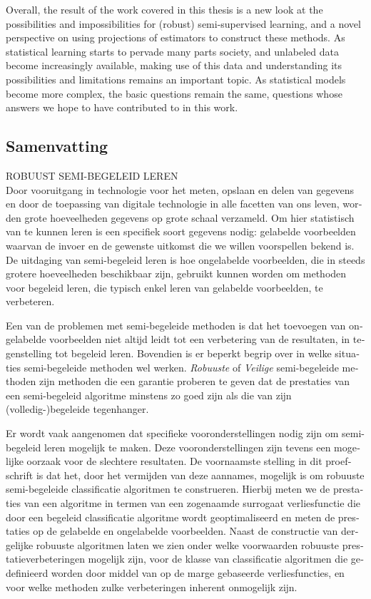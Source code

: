 Overall, the result of the work covered in this thesis is a new look at the possibilities and impossibilities for (robust) semi-supervised learning, and a novel perspective on using projections of estimators to construct these methods. As statistical learning starts to pervade many parts society, and unlabeled data become increasingly available, making use of this data and understanding its possibilities and limitations remains an important topic. As statistical models become more complex, the basic questions remain the same, questions whose answers we hope to have contributed to in this work.

\begin{otherlanguage}{dutch}
\chapter{Samenvatting}
{\LARGE{\textsf{\MakeUppercase{Robuust Semi-begeleid Leren}}}}
\\[12pt]
Door vooruitgang in technologie voor het meten, opslaan en delen van gegevens en door de toepassing van digitale technologie in alle facetten van ons leven, worden grote hoeveelheden gegevens op grote schaal verzameld. Om hier statistisch van te kunnen leren is een specifiek soort gegevens nodig: gelabelde voorbeelden waarvan de invoer en de gewenste uitkomst die we willen voorspellen bekend is. De uitdaging van semi-begeleid leren is hoe ongelabelde voorbeelden, die in steeds grotere hoeveelheden beschikbaar zijn, gebruikt kunnen worden om methoden voor begeleid leren, die typisch enkel leren van gelabelde voorbeelden, te verbeteren.

Een van de problemen met semi-begeleide methoden is dat het toevoegen van ongelabelde voorbeelden niet altijd leidt tot een verbetering van de resultaten, in tegenstelling tot begeleid leren. Bovendien is er beperkt begrip over in welke situaties semi-begeleide methoden wel werken. \emph{Robuuste} of \emph{Veilige} semi-begeleide methoden zijn methoden die een garantie proberen te geven dat de prestaties van een semi-begeleid algoritme minstens zo goed zijn als die van zijn (volledig-)begeleide tegenhanger.

Er wordt vaak aangenomen dat specifieke vooronderstellingen nodig zijn om semi-begeleid leren mogelijk te maken. Deze vooronderstellingen zijn tevens een mogelijke oorzaak voor de slechtere resultaten. De voornaamste stelling in dit proefschrift is dat het, door het vermijden van deze aannames, mogelijk is om robuuste semi-begeleide classificatie algoritmen te construeren. Hierbij meten we de prestaties van een algoritme in termen van een zogenaamde surrogaat verliesfunctie die door een begeleid classificatie algoritme wordt geoptimaliseerd en meten de prestaties op de gelabelde en ongelabelde voorbeelden. Naast de constructie van dergelijke robuuste algoritmen laten we zien onder welke voorwaarden robuuste prestatieverbeteringen mogelijk zijn, voor de klasse van classificatie algoritmen die gedefinieerd worden door middel van op de marge gebaseerde verliesfuncties, en voor welke methoden zulke verbeteringen inherent onmogelijk zijn.


\end{otherlanguage}
